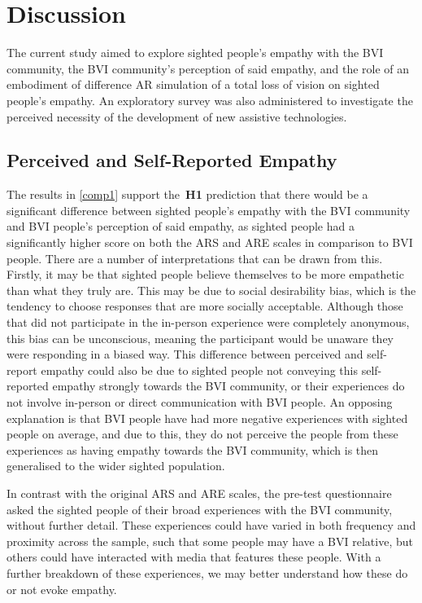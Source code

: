 \documentclass{vgtc}                          %
\begin{document}






\section{Discussion}
\label{section:discussion}
The current study aimed to explore sighted people's empathy with the BVI community, the BVI community's perception of said empathy, and the role of an embodiment of difference AR simulation of a total loss of vision on sighted people's empathy. An exploratory survey was also administered to investigate the perceived necessity of the development of new assistive technologies.

\subsection{Perceived and Self-Reported Empathy}
The results in \ref{comp1} support the~\textbf{H1} prediction that there would be a significant difference between sighted people's empathy with the BVI community and BVI people's perception of said empathy, as sighted people had a significantly higher score on both the ARS and ARE scales in comparison to BVI people. There are a number of interpretations that can be drawn from this. Firstly, it may be that sighted people believe themselves to be more empathetic than what they truly are. This may be due to social desirability bias, which is the tendency to choose responses that are more socially acceptable\cite{grimm2010social}. Although those that did not participate in the in-person experience were completely anonymous, this bias can be unconscious, meaning the participant would be unaware they were responding in a biased way. This difference between perceived and self-report empathy could also be due to sighted people not conveying this self-reported empathy strongly towards the BVI community, or their experiences do not involve in-person or direct communication with BVI people. An opposing explanation is that BVI people have had more negative experiences with sighted people on average, and due to this, they do not perceive the people from these experiences as having empathy towards the BVI community, which is then generalised to the wider sighted population.

In contrast with the original ARS and ARE scales, the pre-test questionnaire asked the sighted people of their broad experiences with the BVI community, without further detail. These experiences could have varied in both frequency and proximity across the sample, such that some people may have a BVI relative, but others could have interacted with media that features these people. With a further breakdown of these experiences, we may better understand how these do or not evoke empathy. 
\end{document}
